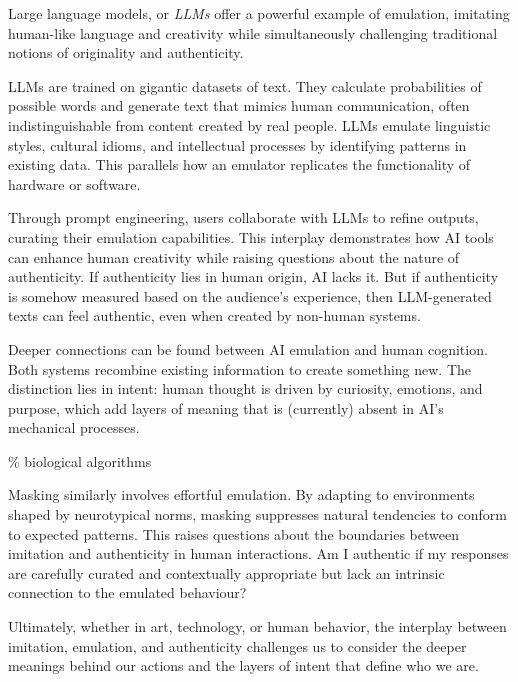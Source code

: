 Large language models, or \textit{LLMs} offer a powerful example of emulation, imitating human-like language and creativity while simultaneously challenging traditional notions of originality and authenticity.

LLMs are trained on gigantic datasets of text. They calculate probabilities of possible words and generate text that mimics human communication, often indistinguishable from content created by real people. LLMs emulate linguistic styles, cultural idioms, and intellectual processes by identifying patterns in existing data. This parallels how an emulator replicates the functionality of hardware or software. 

Through prompt engineering, users collaborate with LLMs to refine outputs, curating their emulation capabilities. This interplay demonstrates how AI tools can enhance human creativity while raising questions about the nature of authenticity. If authenticity lies in human origin, AI lacks it. But if authenticity is somehow measured based on the audience's experience, then LLM-generated texts can feel authentic, even when created by non-human systems.

Deeper connections can be found between AI emulation and human cognition. Both systems recombine existing information to create something new. The distinction lies in intent: human thought is driven by curiosity, emotions, and purpose, which add layers of meaning that is (currently) absent in AI's mechanical processes.

{\scriptsize \textcolor{comment}{\%  biological algorithms}}

Masking similarly involves effortful emulation. By adapting to environments shaped by neurotypical norms, masking suppresses natural tendencies to conform to expected patterns. This raises questions about the boundaries between imitation and authenticity in human interactions. Am I authentic if my responses are carefully curated and contextually appropriate but lack an intrinsic connection to the emulated behaviour?

Ultimately, whether in art, technology, or human behavior, the interplay between imitation, emulation, and authenticity challenges us to consider the deeper meanings behind our actions and the layers of intent that define who we are.